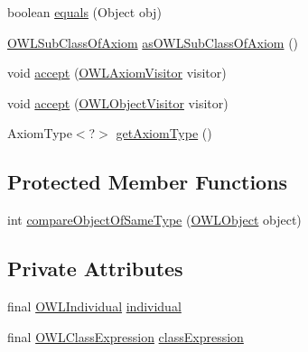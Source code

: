 \begin{DoxyCompactItemize}
\item 
boolean \hyperlink{classuk_1_1ac_1_1manchester_1_1cs_1_1owl_1_1owlapi_1_1_o_w_l_class_assertion_axiom_impl_af3b9324e145d977fcdb4d571422cb200}{equals} (Object obj)
\item 
\hyperlink{interfaceorg_1_1semanticweb_1_1owlapi_1_1model_1_1_o_w_l_sub_class_of_axiom}{O\-W\-L\-Sub\-Class\-Of\-Axiom} \hyperlink{classuk_1_1ac_1_1manchester_1_1cs_1_1owl_1_1owlapi_1_1_o_w_l_class_assertion_axiom_impl_ac69edd5b8fb3b6f9ea00a730d2f27d53}{as\-O\-W\-L\-Sub\-Class\-Of\-Axiom} ()
\item 
void \hyperlink{classuk_1_1ac_1_1manchester_1_1cs_1_1owl_1_1owlapi_1_1_o_w_l_class_assertion_axiom_impl_af8cbddcd20fe9f5c7a1a2e683c3119c0}{accept} (\hyperlink{interfaceorg_1_1semanticweb_1_1owlapi_1_1model_1_1_o_w_l_axiom_visitor}{O\-W\-L\-Axiom\-Visitor} visitor)
\item 
void \hyperlink{classuk_1_1ac_1_1manchester_1_1cs_1_1owl_1_1owlapi_1_1_o_w_l_class_assertion_axiom_impl_a0e650fd2f64db42d9fc33d89f8aca853}{accept} (\hyperlink{interfaceorg_1_1semanticweb_1_1owlapi_1_1model_1_1_o_w_l_object_visitor}{O\-W\-L\-Object\-Visitor} visitor)
\item 
Axiom\-Type$<$?$>$ \hyperlink{classuk_1_1ac_1_1manchester_1_1cs_1_1owl_1_1owlapi_1_1_o_w_l_class_assertion_axiom_impl_a8138519a690e79b16b3011fcf0643a85}{get\-Axiom\-Type} ()
\end{DoxyCompactItemize}
\subsection*{Protected Member Functions}
\begin{DoxyCompactItemize}
\item 
int \hyperlink{classuk_1_1ac_1_1manchester_1_1cs_1_1owl_1_1owlapi_1_1_o_w_l_class_assertion_axiom_impl_ae9ff7f16c1134366395ce54ffe7210e9}{compare\-Object\-Of\-Same\-Type} (\hyperlink{interfaceorg_1_1semanticweb_1_1owlapi_1_1model_1_1_o_w_l_object}{O\-W\-L\-Object} object)
\end{DoxyCompactItemize}
\subsection*{Private Attributes}
\begin{DoxyCompactItemize}
\item 
final \hyperlink{interfaceorg_1_1semanticweb_1_1owlapi_1_1model_1_1_o_w_l_individual}{O\-W\-L\-Individual} \hyperlink{classuk_1_1ac_1_1manchester_1_1cs_1_1owl_1_1owlapi_1_1_o_w_l_class_assertion_axiom_impl_a9964ce9818b14016a0e1943ca74dd249}{individual}
\item 
final \hyperlink{interfaceorg_1_1semanticweb_1_1owlapi_1_1model_1_1_o_w_l_class_expression}{O\-W\-L\-Class\-Expression} \hyperlink{classuk_1_1ac_1_1manchester_1_1cs_1_1owl_1_1owlapi_1_1_o_w_l_class_assertion_axiom_impl_a6a80c806c749e634253e10f0acc080ea}{class\-Expression}
\end{DoxyCompactItemize}
